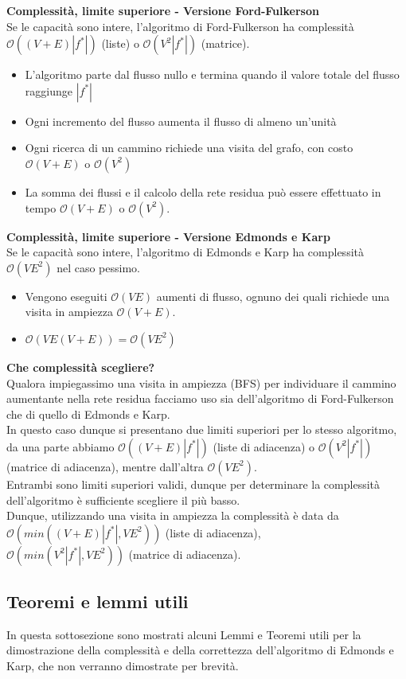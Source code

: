 \documentclass[../cheatSheetAlgoritmi.tex]{subfiles}
\begin{document}
\bigskip
\textbf{Complessità, limite superiore - Versione Ford-Fulkerson} \\
Se le capacità sono intere, l'algoritmo di Ford-Fulkerson ha complessità $\mathcal{O}((V + E)|f^{*}|)$ (liste) o $\mathcal{O}(V^2 |f^*|)$ (matrice).
\begin{itemize}
	\item L'algoritmo parte dal flusso nullo e termina quando il valore totale del flusso raggiunge $|f^*|$
	\item Ogni incremento del flusso aumenta il flusso di almeno un'unità
	\item Ogni ricerca di un cammino richiede una visita del grafo, con costo $\mathcal{O}(V + E)$ o $\mathcal{O}(V^2)$
	\item La somma dei flussi e il calcolo della rete residua può essere effettuato in tempo $\mathcal{O}(V + E) $ o $\mathcal{O}(V^2)$.
\end{itemize}
\textbf{Complessità, limite superiore - Versione Edmonds e Karp} \\
Se le capacità sono intere, l'algoritmo di Edmonds e Karp ha complessità $\mathcal{O}(VE^2)$ nel caso pessimo. 
\begin{itemize}
	\item Vengono eseguiti $\mathcal{O}(VE)$ aumenti di flusso, ognuno dei quali richiede una visita in ampiezza $\mathcal{O}(V + E)$.
	\item $\mathcal{O}(VE(V + E)) = \mathcal{O}(VE^2)$
\end{itemize}
\textbf{Che complessità scegliere?}\\
Qualora impiegassimo una visita in ampiezza (BFS) per individuare il cammino aumentante nella rete residua facciamo uso sia dell'algoritmo di Ford-Fulkerson che di quello di Edmonds e Karp. \\
In questo caso dunque si presentano due limiti superiori per lo stesso algoritmo, da una parte abbiamo $\mathcal{O}((V + E)|f^{*}|)$ (liste di adiacenza) o $\mathcal{O}(V^2 |f^*|)$ (matrice di adiacenza), mentre dall'altra  $\mathcal{O}(VE^2)$.\\
Entrambi sono limiti superiori validi, dunque per determinare la complessità dell'algoritmo è sufficiente scegliere il più basso. \\
Dunque, utilizzando una visita in ampiezza la complessità è data da $\mathcal{O}(min((V + E)|f^{*}|, VE^2))$ (liste di adiacenza),\\ $\mathcal{O}(min(V^2|f^{*}|, VE^2))$ (matrice di adiacenza).
\subsection{Teoremi e lemmi utili}
In questa sottosezione sono mostrati alcuni Lemmi e Teoremi utili per la dimostrazione della complessità e della correttezza dell'algoritmo di Edmonds e Karp, che non verranno dimostrate per brevità.
\end{document}
